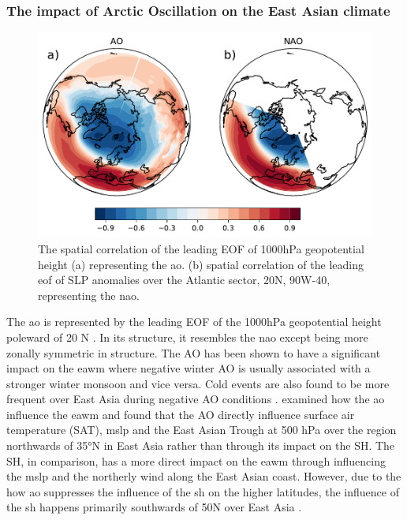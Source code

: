\subsubsection{The impact of Arctic Oscillation on the East Asian climate}
\begin{figure}[htpb]
    \centering
    \includegraphics[width=\textwidth]{texfiles/figs/EOF_AO_NAO.pdf}
    \caption{The spatial correlation of the leading EOF of 1000hPa geopotential height (a) representing the \acrshort{ao}. (b)  spatial correlation of the leading \acrshort{eof}  of SLP anomalies over the Atlantic sector, 20\degree N, 90\degree W-40\degree, representing the \acrshort{nao}.}
    \label{fig:EOF_NAO_AO}
\end{figure}
The \acrfull{ao} is represented by the leading EOF of the 1000hPa geopotential height poleward of 20 \degree N \parencite{thompson1998arctic}. In its structure, it resembles the \acrfull{nao} except being more zonally symmetric in structure. The AO has been shown to have a significant impact on the \acrshort{eawm} where negative winter AO is usually associated with a stronger winter monsoon and vice versa. Cold events are also found to be more frequent over East Asia during negative AO conditions \parencite{he2017impact}. \textcite{wu2002winter} examined how the \acrshort{ao} influence the \acrshort{eawm} and found that the AO directly influence surface air temperature (SAT), \acrshort{mslp} and the East Asian Trough at 500 hPa over the region northwards of 35°N in East Asia rather than through its impact on the SH. The SH, in comparison, has a more direct impact on the \acrshort{eawm} through influencing the \acrshort{mslp} and the northerly wind along the East Asian coast. However, due to the how \acrshort{ao} suppresses the influence of the \acrshort{sh} on the higher latitudes, the influence of the \acrshort{sh} happens primarily southwards of 50\degree N over East Asia \parencite{wu2002winter}. 

